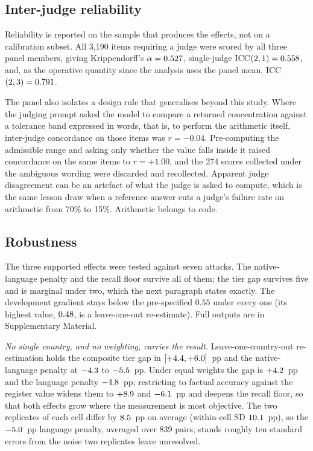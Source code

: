 \subsection{Inter-judge reliability}
\label{sec:results:reliability}

Reliability is reported on the sample that produces the effects, not on a
calibration subset. All 3{,}190 items requiring a judge were scored by all three
panel members, giving Krippendorff's $\alpha=0.527$, single-judge
ICC$(2,1)=0.558$, and, as the operative quantity since the analysis uses the
panel mean, ICC$(2,3)=0.791$.

The panel also isolates a design rule that generalises beyond this study. Where
the judging prompt asked the model to compare a returned concentration against
a tolerance band expressed in words, that is, to perform the arithmetic itself,
inter-judge concordance on those items was $r=-0.04$. Pre-computing the
admissible range and asking only whether the value falls inside it raised
concordance on the same items to $r=+1.00$, and the 274 scores collected under
the ambiguous wording were discarded and recollected. Apparent judge
disagreement can be an artefact of what the judge is asked to compute, which
is the same lesson \citet{zheng2023judging} draw when a reference answer cuts
a judge's failure rate on arithmetic from 70\% to 15\%. Arithmetic belongs to
code.

\subsection{Robustness}
\label{sec:results:robust}

The three supported effects were tested against seven attacks. The
native-language penalty and the recall floor survive all of them; the tier gap
survives five and is marginal under two, which the next paragraph states
exactly. The development gradient stays below the pre-specified $0.55$ under
every one (its highest value, $0.48$, is a leave-one-out re-estimate).
Full outputs are in Supplementary Material.

\emph{No single country, and no weighting, carries the result.}
Leave-one-country-out re-estimation holds the composite tier gap in
$[+4.4,+6.0]$~pp and the native-language penalty at $-4.3$
to $-5.5$~pp. Under equal weights the gap is $+4.2$~pp and the
language penalty $-4.8$~pp; restricting to factual accuracy against
the register value widens them to $+8.9$ and $-6.1$~pp and
deepens the recall floor, so that both effects grow where the measurement is
most objective. The two replicates of each cell differ by $8.5$~pp on
average (within-cell SD $10.1$~pp), so the $-5.0$~pp language
penalty, averaged over 839 pairs, stands roughly ten standard errors from the
noise two replicates leave unresolved.

